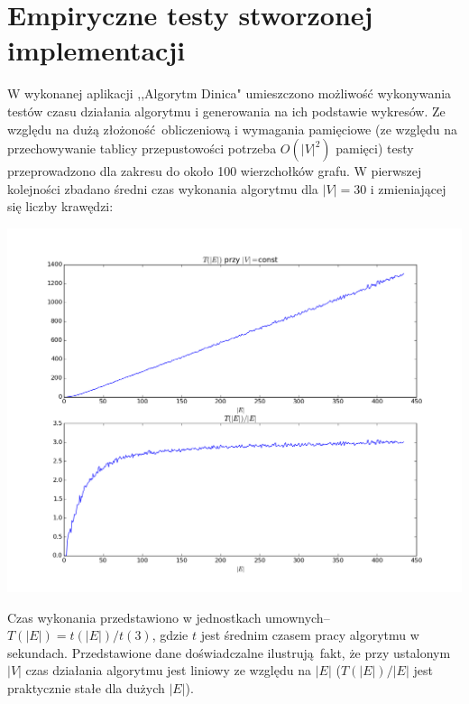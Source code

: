 \documentclass{article}
\begin{document}
\section{Empiryczne testy stworzonej implementacji}
W wykonanej aplikacji ,,Algorytm Dinica" umieszczono możliwość wykonywania testów czasu działania algorytmu i generowania na ich podstawie wykresów. Ze względu na dużą złożoność obliczeniową i wymagania pamięciowe (ze względu na przechowywanie tablicy przepustowości potrzeba $O(|V|^2)$ pamięci) testy przeprowadzono dla zakresu do około 100 wierzchołków grafu. W pierwszej kolejności zbadano średni czas wykonania algorytmu dla $|V|=30$ i zmieniającej się liczby krawędzi:
\begin{center}
\includegraphics[scale=0.5]{constv.png}
\end{center}
Czas wykonania przedstawiono w jednostkach umownych--$T(|E|) = t(|E|)/t(3)$, gdzie $t$ jest średnim czasem pracy algorytmu w sekundach. Przedstawione dane doświadczalne ilustrują fakt, że przy ustalonym $|V|$ czas działania algorytmu jest liniowy ze względu na $|E|$ ($T(|E|)/|E|$ jest praktycznie stałe dla dużych $|E|$).
\end{document}
